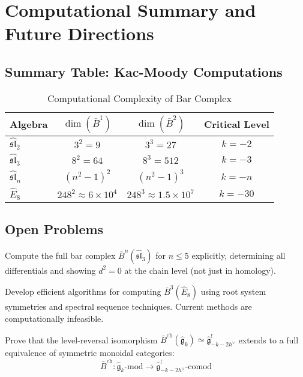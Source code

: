 \section{Computational Summary and Future Directions}

\subsection{Summary Table: Kac-Moody Computations}

\begin{table}[h]
\centering
\caption{Computational Complexity of Bar Complex}
\begin{tabular}{|l|c|c|c|}
\hline
\textbf{Algebra} & $\dim(\bar{B}^1)$ & $\dim(\bar{B}^2)$ & \textbf{Critical Level} \\
\hline
$\widehat{\mathfrak{sl}}_2$ & $3^2 = 9$ & $3^3 = 27$ & $k = -2$ \\
$\widehat{\mathfrak{sl}}_3$ & $8^2 = 64$ & $8^3 = 512$ & $k = -3$ \\
$\widehat{\mathfrak{sl}}_n$ & $(n^2-1)^2$ & $(n^2-1)^3$ & $k = -n$ \\
$\widehat{E}_8$ & $248^2 \approx 6 \times 10^4$ & $248^3 \approx 1.5 \times 10^7$ & $k = -30$ \\
\hline
\end{tabular}
\end{table}

\subsection{Open Problems}

\begin{openproblem}[1]
Compute the full bar complex $\bar{B}^n(\widehat{\mathfrak{sl}}_3)$ for $n \le 5$ explicitly, determining all differentials and showing $d^2 = 0$ at the chain level (not just in homology).
\end{openproblem}

\begin{openproblem}[2]
Develop efficient algorithms for computing $\bar{B}^3(\widehat{E}_8)$ using root system symmetries and spectral sequence techniques. Current methods are computationally infeasible.
\end{openproblem}

\begin{openproblem}[3]
Prove that the level-reversal isomorphism $\bar{B}^{\text{ch}}(\widehat{\mathfrak{g}}_k) \simeq \widehat{\mathfrak{g}}_{-k-2h^\vee}^!$ extends to a full equivalence of symmetric monoidal categories:
$$\bar{B}^{\text{ch}}: \widehat{\mathfrak{g}}_k\text{-mod} \to \widehat{\mathfrak{g}}_{-k-2h^\vee}^!\text{-comod}$$
\end{openproblem}

